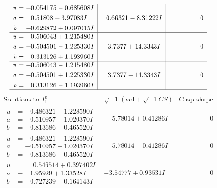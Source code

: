 \documentclass[1p]{elsarticle_modified}
\theoremstyle{definition}
\newcommand{\I}{\sqrt{-1}}
\begin{document}
$$\begin{array}{c|c|c}
\begin{aligned}
u &= -0.054175 - 0.685608 I \\
a &= \phantom{-}0.51808 - 3.97083 I \\
b &= -0.629872 + 0.097015 I\end{aligned}
 & \phantom{-}0.66321 - 8.31222 I & \phantom{-0.000000 } 0 \\ \hline\begin{aligned}
u &= -0.506043 + 1.215480 I \\
a &= -0.504501 - 1.225330 I \\
b &= \phantom{-}0.313126 + 1.193960 I\end{aligned}
 & \phantom{-}3.7377 + 14.3343 I & \phantom{-0.000000 } 0 \\ \hline\begin{aligned}
u &= -0.506043 - 1.215480 I \\
a &= -0.504501 + 1.225330 I \\
b &= \phantom{-}0.313126 - 1.193960 I\end{aligned}
 & \phantom{-}3.7377 - 14.3343 I & \phantom{-0.000000 } 0\\
 \hline 
 \end{array}$$\newpage$$\begin{array}{c|c|c}  
\text{Solutions to }I^u_{1}& \I (\text{vol} + \sqrt{-1}CS) & \text{Cusp shape}\\
 \hline 
\begin{aligned}
u &= -0.486321 + 1.228590 I \\
a &= -0.510957 - 1.020370 I \\
b &= -0.813686 + 0.465520 I\end{aligned}
 & \phantom{-}5.78014 + 0.41286 I & \phantom{-0.000000 } 0 \\ \hline\begin{aligned}
u &= -0.486321 - 1.228590 I \\
a &= -0.510957 + 1.020370 I \\
b &= -0.813686 - 0.465520 I\end{aligned}
 & \phantom{-}5.78014 - 0.41286 I & \phantom{-0.000000 } 0 \\ \hline\begin{aligned}
u &= \phantom{-}0.546514 + 0.397402 I \\
a &= -1.95929 + 1.33528 I \\
b &= -0.727239 + 0.164143 I\end{aligned}
 & -3.54777 + 0.93531 I & \phantom{-0.000000 } 0 \\ \hline\begin{aligned}

\end{aligned}
\end{array}$$
\end{document}
